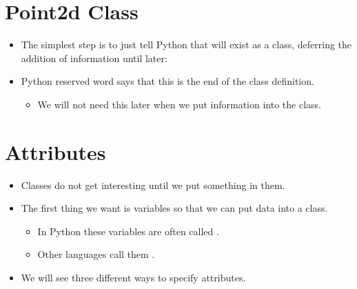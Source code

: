 \documentclass[letterpaper,10pt,english]{sphinxmanual}
\begin{document}
\section{Point2d Class}
\label{\detokenize{lecture_notes/lec18_classes1:point2d-class}}\begin{itemize}
\item {} 
The simplest step is to just tell Python that  will exist as a
class, deferring the addition of information until later:

\begin{sphinxVerbatim}[commandchars=\\\{\}]
 
\end{sphinxVerbatim}

\item {} 
Python reserved word  says that this is the end of the
class definition.
\begin{itemize}
\item {} 
We will not need this later when we put information into the
class.

\end{itemize}

\end{itemize}


\section{Attributes}
\label{\detokenize{lecture_notes/lec18_classes1:attributes}}\begin{itemize}
\item {} 
Classes do not get interesting until we put something in them.

\item {} 
The first thing we want is variables so that we can put data into a
class.
\begin{itemize}
\item {} 
In Python these variables are often called .

\item {} 
Other languages call them .

\end{itemize}

\item {} 
We will see three different ways to specify attributes.

\end{itemize}
\end{document}
